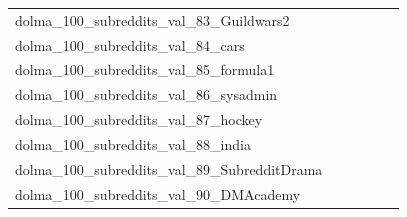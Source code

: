 \documentclass[dvipsnames]{article}
\begin{document}
\begin{appendix}
{\begin{longtable}{m{6cm}m{1.7cm}m{1.7cm}m{1.7cm}m{1.7cm}m{1.7cm}}
	dolma\_100\_subreddits\_val\_83\_Guildwars2  & \colorbox[HTML]{ffffe5}{\makebox[\mywidth][c]{32.98}} & \colorbox[HTML]{c9e99b}{\makebox[\mywidth][c]{31.17}} & \colorbox[HTML]{ffffe5}{\makebox[\mywidth][c]{33.58}} & \colorbox[HTML]{e9f6af}{\makebox[\mywidth][c]{31.39}} & \colorbox[HTML]{77c578}{\makebox[\mywidth][c]{30.91}}\\
	dolma\_100\_subreddits\_val\_84\_cars  & \colorbox[HTML]{ffffe5}{\makebox[\mywidth][c]{22.57}} & \colorbox[HTML]{e4f4ab}{\makebox[\mywidth][c]{21.41}} & \colorbox[HTML]{ffffe5}{\makebox[\mywidth][c]{22.73}} & \colorbox[HTML]{def2a6}{\makebox[\mywidth][c]{21.38}} & \colorbox[HTML]{77c578}{\makebox[\mywidth][c]{21.15}}\\
	dolma\_100\_subreddits\_val\_85\_formula1  & \colorbox[HTML]{ffffe5}{\makebox[\mywidth][c]{23.85}} & \colorbox[HTML]{cae99c}{\makebox[\mywidth][c]{22.65}} & \colorbox[HTML]{ffffe5}{\makebox[\mywidth][c]{24.09}} & \colorbox[HTML]{dcf1a5}{\makebox[\mywidth][c]{22.71}} & \colorbox[HTML]{77c578}{\makebox[\mywidth][c]{22.49}}\\
	dolma\_100\_subreddits\_val\_86\_sysadmin  & \colorbox[HTML]{ffffe5}{\makebox[\mywidth][c]{24.23}} & \colorbox[HTML]{def2a6}{\makebox[\mywidth][c]{22.90}} & \colorbox[HTML]{ffffe5}{\makebox[\mywidth][c]{24.41}} & \colorbox[HTML]{e8f6ae}{\makebox[\mywidth][c]{22.96}} & \colorbox[HTML]{77c578}{\makebox[\mywidth][c]{22.64}}\\
	dolma\_100\_subreddits\_val\_87\_hockey  & \colorbox[HTML]{ffffe5}{\makebox[\mywidth][c]{21.46}} & \colorbox[HTML]{9bd587}{\makebox[\mywidth][c]{20.26}} & \colorbox[HTML]{ffffe5}{\makebox[\mywidth][c]{21.74}} & \colorbox[HTML]{d0ec9e}{\makebox[\mywidth][c]{20.37}} & \colorbox[HTML]{77c578}{\makebox[\mywidth][c]{20.20}}\\
	dolma\_100\_subreddits\_val\_88\_india  & \colorbox[HTML]{ffffe5}{\makebox[\mywidth][c]{24.15}} & \colorbox[HTML]{dbf1a4}{\makebox[\mywidth][c]{22.92}} & \colorbox[HTML]{ffffe5}{\makebox[\mywidth][c]{24.42}} & \colorbox[HTML]{f5fbb7}{\makebox[\mywidth][c]{23.08}} & \colorbox[HTML]{77c578}{\makebox[\mywidth][c]{22.68}}\\
	dolma\_100\_subreddits\_val\_89\_SubredditDrama  & \colorbox[HTML]{ffffe5}{\makebox[\mywidth][c]{19.14}} & \colorbox[HTML]{c5e799}{\makebox[\mywidth][c]{18.26}} & \colorbox[HTML]{ffffe5}{\makebox[\mywidth][c]{19.63}} & \colorbox[HTML]{d0ec9e}{\makebox[\mywidth][c]{18.29}} & \colorbox[HTML]{77c578}{\makebox[\mywidth][c]{18.12}}\\
	dolma\_100\_subreddits\_val\_90\_DMAcademy  & \colorbox[HTML]{ffffe5}{\makebox[\mywidth][c]{27.77}} & \colorbox[HTML]{d8efa2}{\makebox[\mywidth][c]{26.31}} & \colorbox[HTML]{ffffe5}{\makebox[\mywidth][c]{28.38}} & \colorbox[HTML]{e5f5ac}{\makebox[\mywidth][c]{26.41}} & \colorbox[HTML]{77c578}{\makebox[\mywidth][c]{26.00}}\\

\end{longtable}}
\end{appendix}
\end{document}
